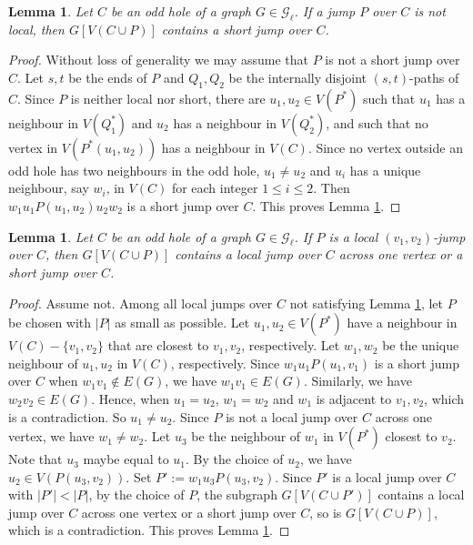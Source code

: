 \documentclass[11pt]{article}
\newtheorem{lemma}[theorem]{Lemma}
\begin{document}

\begin{lemma}\label{jump}
Let $C$ be an odd hole of a graph $G\in \mathcal{G}_{\ell}$. If a jump $P$ over $C$ is not local, then $G[V(C\cup P)]$ contains a short jump over $C$.
\end{lemma}
\begin{proof}
Without loss of generality we may assume that $P$ is not a short jump over $C$.
Let $s,t$ be the ends of $P$ and $Q_1,Q_2$ be the internally disjoint $(s,t)$-paths of $C$. Since $P$ is neither local nor short, there are $u_1,u_2\in V(P^*)$ such that $u_1$ has a neighbour in $V(Q_1^*)$ and $u_2$ has a neighbour in $V(Q_2^*)$, and such that no vertex in $V(P^*(u_1,u_2))$ has a neighbour in $V(C)$. Since no vertex outside an odd hole has two neighbours in the odd hole, $u_1\neq u_2$ and $u_i$ has a unique neighbour, say $w_i$, in $V(C)$ for each integer $1\leq i\leq2$. Then $w_1u_1P(u_1,u_2)u_2w_2$ is a short jump over $C$. This proves Lemma \ref{jump}.
\end{proof}

\begin{lemma}\label{jump-local}
Let $C$ be an odd hole of a graph $G\in \mathcal{G}_{\ell}$. If $P$ is a local $(v_1,v_2)$-jump over $C$, then $G[V(C\cup P)]$ contains a local jump over $C$ across one vertex or a short jump over $C$.
\end{lemma}
\begin{proof}
Assume not. Among all local jumps over $C$ not satisfying Lemma \ref{jump-local}, let $P$ be chosen with $|P|$ as small as possible. Let $u_1,u_2\in V(P^*)$ have a neighbour in $V(C)-\{v_1,v_2\}$ that are closest to $v_1,v_2$, respectively. Let $w_1,w_2$ be the unique neighbour of $u_1,u_2$ in $V(C)$, respectively. Since $w_1u_1P(u_1,v_1)$ is a short jump over $C$ when $w_1v_1\notin E(G)$, we have $w_1v_1\in E(G)$. Similarly, we have $w_2v_2\in E(G)$. Hence, when $u_1=u_2$, $w_1=w_2$ and $w_1$ is adjacent to $v_1,v_2$, which is a contradiction.  So $u_1\neq u_2$. Since $P$ is not a local jump over $C$ across one vertex, we have $w_1\neq w_2$. Let $u_3$ be the neighbour of $w_1$ in $V(P^*)$ closest to $v_2$. Note that $u_3$ maybe equal to $u_1$. By the choice of $u_2$, we have $u_2\in V(P(u_3,v_2))$. Set $P':=w_1u_3P(u_3,v_2)$. Since $P'$ is a local jump over $C$ with $|P'|<|P|$, by the choice of $P$, the subgraph $G[V(C\cup P')]$ contains a local jump over $C$ across one vertex or a short jump over $C$, so is $G[V(C\cup P)]$, which is a contradiction. This proves Lemma \ref{jump-local}.
\end{proof}
\end{document}
